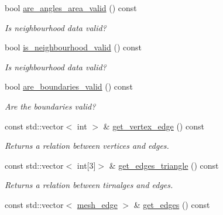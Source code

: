 \begin{DoxyCompactItemize}
\mbox{\label{classgeoproc_1_1TriangleMesh_ad25eb7051e7eac604142d45929f33c19}} 
bool \hyperlink{classgeoproc_1_1TriangleMesh_ad25eb7051e7eac604142d45929f33c19}{are\+\_\+angles\+\_\+area\+\_\+valid} () const
\begin{DoxyCompactList}\small\item\em Is neighbourhood data valid? \end{DoxyCompactList}\item 
\mbox{\label{classgeoproc_1_1TriangleMesh_aa6f95b95709a72a14a15638bfeeed3f9}} 
bool \hyperlink{classgeoproc_1_1TriangleMesh_aa6f95b95709a72a14a15638bfeeed3f9}{is\+\_\+neighbourhood\+\_\+valid} () const
\begin{DoxyCompactList}\small\item\em Is neighbourhood data valid? \end{DoxyCompactList}\item 
\mbox{\label{classgeoproc_1_1TriangleMesh_a409e399857e1a1abc9f23918ff5f5860}} 
bool \hyperlink{classgeoproc_1_1TriangleMesh_a409e399857e1a1abc9f23918ff5f5860}{are\+\_\+boundaries\+\_\+valid} () const
\begin{DoxyCompactList}\small\item\em Are the boundaries valid? \end{DoxyCompactList}\item 
const std\+::vector$<$ int $>$ \& \hyperlink{classgeoproc_1_1TriangleMesh_ae73a760e61250eb2f474b8ab03a1e2ab}{get\+\_\+vertex\+\_\+edge} () const
\begin{DoxyCompactList}\small\item\em Returns a relation between vertices and edges. \end{DoxyCompactList}\item 
const std\+::vector$<$ int\mbox{[}3\mbox{]}$>$ \& \hyperlink{classgeoproc_1_1TriangleMesh_af56b3521a8df241f4f67c7f2bbacfa51}{get\+\_\+edges\+\_\+triangle} () const
\begin{DoxyCompactList}\small\item\em Returns a relation between tirnalges and edges. \end{DoxyCompactList}\item 
const std\+::vector$<$ \hyperlink{classgeoproc_1_1mesh__edge}{mesh\+\_\+edge} $>$ \& \hyperlink{classgeoproc_1_1TriangleMesh_a742e5769cb3e26303eb8ec1af57c9ac4}{get\+\_\+edges} () const

\end{DoxyCompactItemize}
